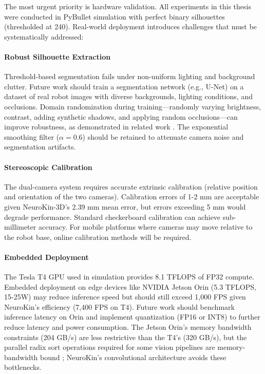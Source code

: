 \documentclass[12pt,a4paper,oneside]{report}
\begin{document}
The most urgent priority is hardware validation. All experiments in this thesis were conducted in PyBullet simulation with perfect binary silhouettes (thresholded at 240). Real-world deployment introduces challenges that must be systematically addressed:

\paragraph{Robust Silhouette Extraction}
Threshold-based segmentation fails under non-uniform lighting and background clutter. Future work should train a segmentation network (e.g., U-Net) on a dataset of real robot images with diverse backgrounds, lighting conditions, and occlusions. Domain randomization during training—randomly varying brightness, contrast, adding synthetic shadows, and applying random occlusions—can improve robustness, as demonstrated in related work \cite{rezvani2024robust, qiu2024swim2real}. The exponential smoothing filter ($\alpha = 0.6$) should be retained to attenuate camera noise and segmentation artifacts.

\paragraph{Stereoscopic Calibration}
The dual-camera system requires accurate extrinsic calibration (relative position and orientation of the two cameras). Calibration errors of 1-2 mm are acceptable given NeuroKin-3D's 2.39 mm mean error, but errors exceeding 5 mm would degrade performance. Standard checkerboard calibration can achieve sub-millimeter accuracy. For mobile platforms where cameras may move relative to the robot base, online calibration methods will be required.

\paragraph{Embedded Deployment}
The Tesla T4 GPU used in simulation provides 8.1 TFLOPS of FP32 compute. Embedded deployment on edge devices like NVIDIA Jetson Orin (5.3 TFLOPS, 15-25W) may reduce inference speed but should still exceed 1,000 FPS given NeuroKin's efficiency (7,400 FPS on T4). Future work should benchmark inference latency on Orin and implement quantization (FP16 or INT8) to further reduce latency and power consumption. The Jetson Orin's memory bandwidth constraints (204 GB/s) are less restrictive than the T4's (320 GB/s), but the parallel radix sort operations required for some vision pipelines are memory-bandwidth bound \cite{lassanske2024gaurast}; NeuroKin's convolutional architecture avoids these bottlenecks.
\end{document}
